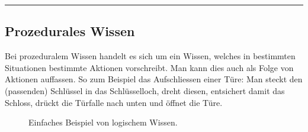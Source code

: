 \noindent\rule[1ex]{\textwidth}{1pt}

\subsection{Prozedurales Wissen}
\label{subsec:prozedurales_wissen}
Bei prozeduralem Wissen handelt es sich um ein Wissen, welches in bestimmten Situationen bestimmte Aktionen vorschreibt. Man kann dies auch als Folge von Aktionen auffassen. So zum Beispiel das Aufschliessen einer Türe: Man steckt den (passenden) Schlüssel in das Schlüsselloch, dreht diesen, entsichert damit das Schloss, drückt die Türfalle nach unten und öffnet die Türe.

\begin{figure}[htbp]
\centering {}
\caption{Einfaches Beispiel von logischem Wissen.\label{fig:experten_systeme_prozedurales_wissen}\protect\footnotemark}
\end{figure}

